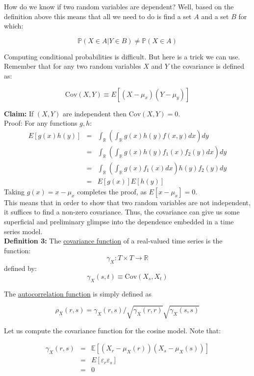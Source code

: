 \documentclass[12] {article}
\begin{document}
How do we know if two random variables are dependent? Well, based on the definition above this means that all we need to do is find a set $A$ and a set $B$ for which:

\[ \mathbb{P}(X \in A | Y \in B) \neq \mathbb{P}(X \in A) \]

Computing conditional probabilities is difficult. But here is a trick we can use. Remember that for any two random variables $X$ and $Y$ the covariance is defined as:

\[ \textrm{Cov}(X,Y) \equiv E [ (X-\mu_x)(Y-\mu_y) ]  \]


\noindent \textbf{Claim:} If $(X, Y)$ are independent then $\textrm{Cov}(X,Y)=0$.  \\


\noindent Proof: For any functions $g,h$:\\
\begin{eqnarray*}
E[ g(x) h(y) ] &=& \int_{\mathbb{R}} \left( \int_{\mathbb{R}} g(x) h(y) f(x,y) dx \right) dy \\
&=& \int_{\mathbb{R}} \left( \int_{\mathbb{R}} g(x) h(y) f_1(x) f_{2}(y) dx \right) dy \\
&=& \int_{\mathbb{R}} \left( \int_{\mathbb{R}} g(x)  f_1(x)  dx \right) h(y) f_{2}(y) dy \\
&=& E[ g(x) ] E[h(y)]
\end{eqnarray*}
Taking $g(x)=x -\mu_x$ completes the proof, as $E[x-\mu_x]=0$.  \\


This means that in order to show that two random variables are not independent, it suffices to find a non-zero covariance. Thus, the covariance can give us some superficial and preliminary glimpse into the dependence embedded in a time series model.  \\

\noindent \textbf{Definition 3:} The \underline{covariance function} of a real-valued time series is the function:
\[ \gamma_{X}: T \times T \rightarrow \mathbb{R} \]
defined by:
\[ \gamma_{X}(s,t) \equiv \textrm{Cov} ( X_s, X_t )\] 

\noindent The \underline{autocorrelation function} is simply defined as

\[  \rho_{X}(r,s) = \gamma_X(r,s) / \sqrt{\gamma_{X}(r,r)} \sqrt{\gamma_{X}(s,s)}   \]

Let us compute the covariance function for the cosine model. Note that:

\begin{eqnarray*}
\gamma_{X} (r,s) &=& \mathbb{E}  [ (X_r - \mu_X(r)) (X_s - \mu_X(s))    ]   \\
&=& E [ \varepsilon_{r} \varepsilon_s ] \\
&=& 0
\end{eqnarray*}
\end{document}
